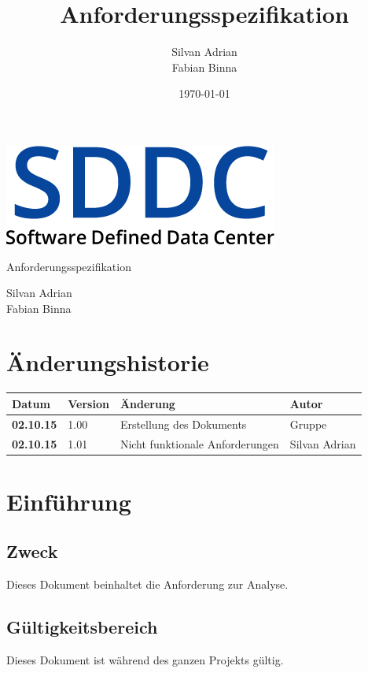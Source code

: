\documentclass[11pt]{scrartcl}
\title{Anforderungsspezifikation}
\author{Silvan Adrian \\ Fabian Binna}
\date{\today{}}
\begin{document}
\def\arraystretch{1.5}
\begin{titlepage}
\begin{center}
\vspace{10em}
\includegraphics[scale=2]{SDDC}
\vspace{10em}
\end{center}
\begin{center}
\huge {Anforderungsspezifikation}
\end{center}
\begin{center}
\vspace{10em}
\LARGE {Silvan Adrian} \\
\LARGE {Fabian Binna}
\end{center}

\end{titlepage}

\newpage
\section{Änderungshistorie}
\begin{tabularx}{\linewidth}{l l X l}
\textbf{Datum} & \textbf{Version} & \textbf{Änderung}  & \textbf{Autor} \\
\hline
\textbf{02.10.15} & 1.00 & Erstellung des Dokuments & Gruppe \\
\textbf{02.10.15} & 1.01 & Nicht funktionale Anforderungen & Silvan Adrian\\


\end{tabularx}

\newpage
\tableofcontents
\newpage

\section{Einführung}
\subsection{Zweck}
Dieses Dokument beinhaltet die Anforderung zur Analyse.
\subsection{Gültigkeitsbereich}
Dieses Dokument ist während des ganzen Projekts gültig.
\end{document}
